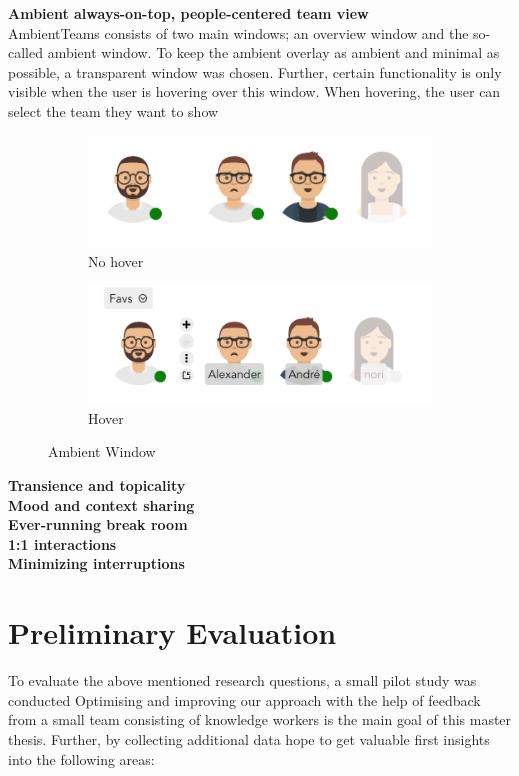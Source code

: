 \medskip\noindent\textbf{Ambient always-on-top, people-centered team view} \\
AmbientTeams consists of two main windows; an overview window and the so-called ambient window. To keep the ambient overlay as ambient and minimal as possible, a transparent window was chosen. Further, certain functionality is only visible when the user is hovering over this window. When hovering, the user can select the team they want to show

\begin{figure}[h]
    \centering
    \begin{subfigure}{.5\textwidth}
        \centering
        \includegraphics[width=.8\linewidth]{./images/AT_no_hover.png}
        \caption{No hover }
        \label{fig:at_no_hover}
    \end{subfigure}%
    \begin{subfigure}{.5\textwidth}
        \centering
        \includegraphics[width=.8\linewidth]{./images/AT_hover.png}
        \caption{Hover }
        \label{fig:at_hover}
    \end{subfigure}
    \caption{Ambient Window}
\end{figure}

\medskip\noindent\textbf{Transience and topicality} \\
\medskip\noindent\textbf{Mood and context sharing} \\
\medskip\noindent\textbf{Ever-running break room} \\
\medskip\noindent\textbf{1:1 interactions} \\
\medskip\noindent\textbf{Minimizing interruptions} \\

\section{Preliminary Evaluation}
To evaluate the above mentioned research questions, a small pilot study was conducted Optimising and improving our approach with the help of feedback from a small team consisting of knowledge workers is the main goal of this master thesis. Further, by collecting additional data hope to get valuable first insights into the following areas:


